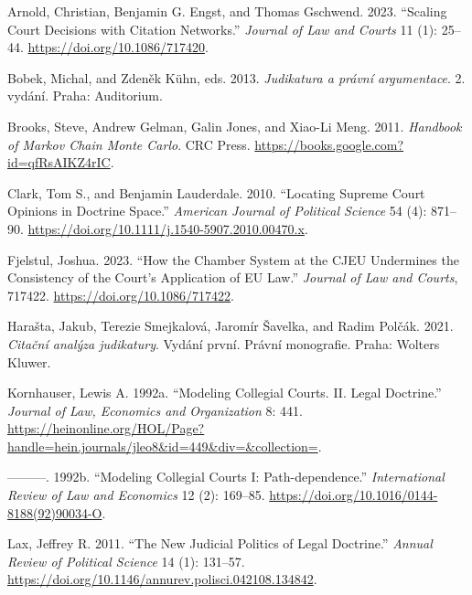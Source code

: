 \documentclass[
  11pt,
]{article}
\newlength{\cslhangindent}
\newenvironment{CSLReferences}[2] %
 {%
  \setlength{\parindent}{0pt}
  \ifodd #1 \everypar{\setlength{\hangindent}{\cslhangindent}}\ignorespaces\fi
  \ifnum #2 > 0
  \setlength{\parskip}{#2\baselineskip}
  \fi
 }%
 {}
\begin{document}
\label{refs}
\begin{CSLReferences}{1}{0}
Arnold, Christian, Benjamin G. Engst, and Thomas Gschwend. 2023.
{``Scaling {Court Decisions} with {Citation Networks}.''} \emph{Journal
of Law and Courts} 11 (1): 25--44. \url{https://doi.org/10.1086/717420}.

Bobek, Michal, and Zdeněk Kühn, eds. 2013. \emph{Judikatura a právní
argumentace}. 2. vydání. {Praha}: {Auditorium}.

Brooks, Steve, Andrew Gelman, Galin Jones, and Xiao-Li Meng. 2011.
\emph{Handbook of {Markov Chain Monte Carlo}}. {CRC Press}.
\url{https://books.google.com?id=qfRsAIKZ4rIC}.

Clark, Tom S., and Benjamin Lauderdale. 2010. {``Locating {Supreme Court
Opinions} in {Doctrine Space}.''} \emph{American Journal of Political
Science} 54 (4): 871--90.
\url{https://doi.org/10.1111/j.1540-5907.2010.00470.x}.

Fjelstul, Joshua. 2023. {``How the {Chamber System} at the {CJEU
Undermines} the {Consistency} of the {Court}'s {Application} of {EU
Law}.''} \emph{Journal of Law and Courts}, 717422.
\url{https://doi.org/10.1086/717422}.

Harašta, Jakub, Terezie Smejkalová, Jaromír Šavelka, and Radim Polčák.
2021. \emph{Citační analýza judikatury}. Vydání první. Právní
monografie. {Praha}: {Wolters Kluwer}.

Kornhauser, Lewis A. 1992a. {``Modeling {Collegial Courts}. {II}. {Legal
Doctrine}.''} \emph{Journal of Law, Economics and Organization} 8: 441.
\url{https://heinonline.org/HOL/Page?handle=hein.journals/jleo8&id=449&div=&collection=}.

---------. 1992b. {``Modeling Collegial Courts {I}:
{Path-dependence}.''} \emph{International Review of Law and Economics}
12 (2): 169--85. \url{https://doi.org/10.1016/0144-8188(92)90034-O}.

Lax, Jeffrey R. 2011. {``The {New Judicial Politics} of {Legal
Doctrine}.''} \emph{Annual Review of Political Science} 14 (1): 131--57.
\url{https://doi.org/10.1146/annurev.polisci.042108.134842}.


\end{CSLReferences}
\end{document}
